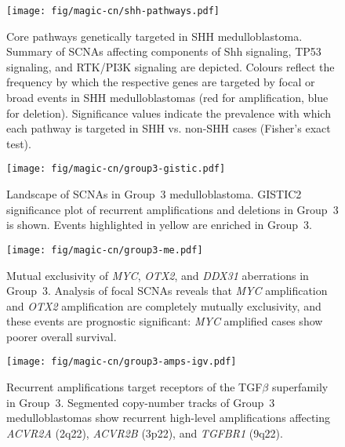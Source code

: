 \documentclass[11pt,letterpaper]{article}
\theoremstyle{definition}
\begin{document}
\begin{figure}[h]
	\begin{center}
		\texttt{[image: fig/magic-cn/shh-pathways.pdf]}
	\end{center}
	\caption[Core pathways genetically targeted in SHH medulloblastoma]
	{
	Core pathways genetically targeted in SHH medulloblastoma.
	Summary of SCNAs affecting components of Shh signaling, TP53 signaling, and RTK/PI3K signaling are depicted. Colours reflect the frequency by which the respective genes are targeted by focal or broad events in SHH medulloblastomas (red for amplification, blue for deletion). Significance values indicate the prevalence with which each pathway is targeted in SHH vs. non-SHH cases (Fisher's exact test).
	}
	\label{fig:shh-pathways}
\end{figure}

\clearpage

\begin{figure}[h]
	\begin{center}
		\texttt{[image: fig/magic-cn/group3-gistic.pdf]}
	\end{center}
	\caption[Landscape of SCNAs in Group~3 medulloblastoma]
	{
	Landscape of SCNAs in Group~3 medulloblastoma.
	GISTIC2 significance plot of recurrent amplifications and deletions in Group~3 is shown. Events highlighted in yellow are enriched in Group~3.
	}
	\label{fig:group3-gistic}
\end{figure}

\clearpage

\begin{figure}[h]
	\begin{center}
		\texttt{[image: fig/magic-cn/group3-me.pdf]}
	\end{center}
	\caption[Mutual exclusivity of \emph{MYC}, \emph{OTX2}, and \emph{DDX31} aberrations in Group~3]
	{
	Mutual exclusivity of \emph{MYC}, \emph{OTX2}, and \emph{DDX31} aberrations in Group~3.
	Analysis of focal SCNAs reveals that \emph{MYC} amplification and \emph{OTX2} amplification are completely mutually exclusivity, and these events are prognostic significant: \emph{MYC} amplified cases show poorer overall survival.
	}
	\label{fig:group3-me}
\end{figure}

\begin{SCfigure}
	\centering
	\texttt{[image: fig/magic-cn/group3-amps-igv.pdf]}
	\caption[Recurrent amplifications target receptors of the TGF$\beta$ superfamily in Group~3]
	{
	Recurrent amplifications target receptors of the TGF$\beta$ superfamily in Group~3.
	Segmented copy-number tracks of Group~3 medulloblastomas show recurrent high-level amplifications affecting \emph{ACVR2A} (2q22), \emph{ACVR2B} (3p22), and \emph{TGFBR1} (9q22).
	}
	\label{fig:group3-amps-igv}
\end{SCfigure}
\end{document}
